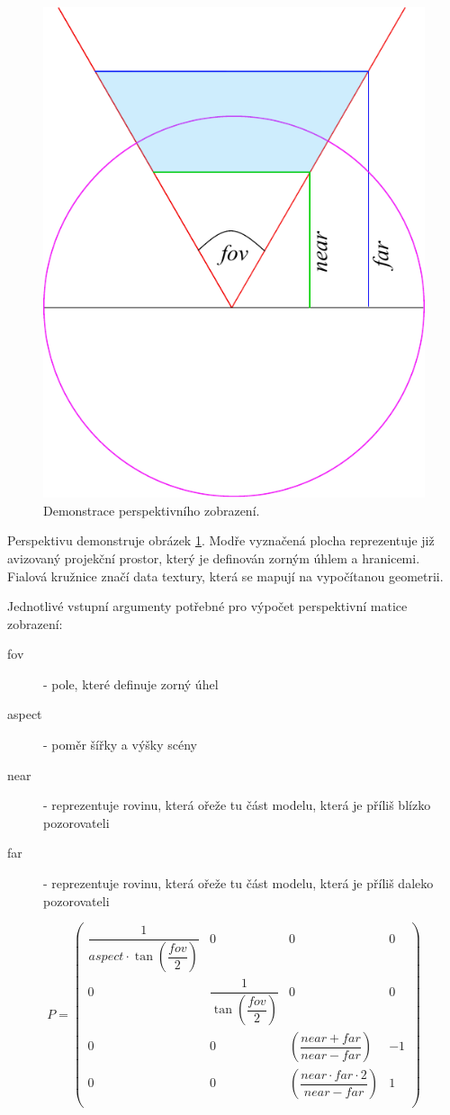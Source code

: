 \begin{figure}[h]
	\label{img:perspective_matrix}
	\centering
	\includegraphics[scale=1.0,angle=0,width=0.45\linewidth]{obrazky-figures/perspective_matrix}
	\caption{Demonstrace perspektivního zobrazení.}
\end{figure}

Perspektivu demonstruje obrázek \ref{img:perspective_matrix}. Modře vyznačená plocha reprezentuje již avizovaný projekční prostor, který je definován  zorným úhlem a hranicemi. Fialová kružnice značí data textury, která se mapují na vypočítanou geometrii.

\newpage

Jednotlivé vstupní argumenty potřebné pro výpočet perspektivní matice zobrazení:

\begin{description}
		\item[fov] - pole, které definuje zorný úhel
		\item[aspect] - poměr šířky a výšky scény
		\item[near] - reprezentuje rovinu, která ořeže tu část modelu, která je příliš blízko pozorovateli
		\item[far] - reprezentuje rovinu, která ořeže tu část modelu, která je příliš daleko pozorovateli
\end{description}


$$
P =
\begin{pmatrix} 
\dfrac{1}{aspect \cdot \tan\left(\dfrac{ fov }{2}\right)} & 0 & 0 & 0\\
0 & \dfrac{1}{\tan\left(\dfrac{ fov }{2}\right)} & 0 & 0\\ 
0 & 0 & \left(\dfrac{near+far}{near-far}\right) & -1\\ 
0 & 0 &  \left(\dfrac{near \cdot far \cdot 2}{near-far}\right)  & 1\\ 
\end{pmatrix}
$$



